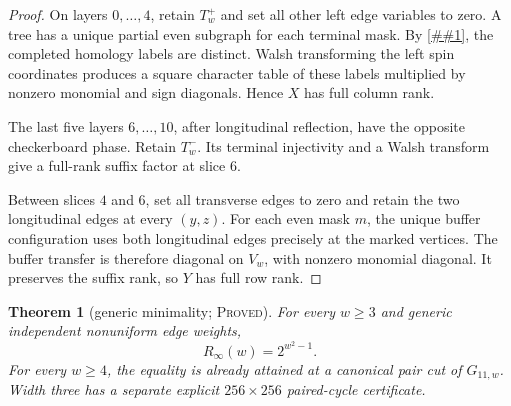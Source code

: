 \documentclass[11pt]{article}
\newcommand{\cref}[1]{\autoref{##1}}%
\newtheorem{theorem}{Theorem}[section]
\newcommand{\claimtag}[1]{\textsc{#1}}
\newcommand{\proved}{\claimtag{Proved}}
\begin{document}
\begin{proof}
On layers \(0,\ldots,4\), retain \(T_w^+\) and set all other left edge
variables to zero.  A tree has a unique partial even subgraph for each
terminal mask.  By \cref{lem:encoders}, the completed homology labels are
distinct.  Walsh transforming the left spin coordinates produces a square
character table of these labels multiplied by nonzero monomial and sign
diagonals.  Hence \(X\) has full column rank.

The last five layers \(6,\ldots,10\), after longitudinal reflection, have the
opposite checkerboard phase.  Retain \(T_w^-\).  Its terminal injectivity and
a Walsh transform give a full-rank suffix factor at slice \(6\).

Between slices \(4\) and \(6\), set all transverse edges to zero and retain
the two longitudinal edges at every \((y,z)\).  For each even mask \(m\), the
unique buffer configuration uses both longitudinal edges precisely at the
marked vertices.  The buffer transfer is therefore diagonal on \(V_w\), with
nonzero monomial diagonal.  It preserves the suffix rank, so \(Y\) has full
row rank.
\end{proof}

\begin{theorem}[generic minimality; \proved]\label{thm:grid-tight}
For every \(w\geq3\) and generic independent nonuniform edge weights,
\[
 R_\infty(w)=2^{w^2-1}.
\]
For every \(w\geq4\), the equality is already attained at a canonical pair
cut of \(G_{11,w}\).  Width three has a separate explicit \(256\times256\)
paired-cycle certificate.

\end{theorem}
\end{document}
